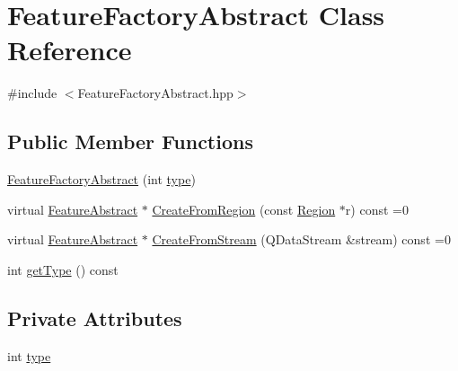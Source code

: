 \hypertarget{class_feature_factory_abstract}{\section{Feature\+Factory\+Abstract Class Reference}
\label{class_feature_factory_abstract}
}


{\ttfamily \#include $<$Feature\+Factory\+Abstract.\+hpp$>$}

\subsection*{Public Member Functions}
\begin{DoxyCompactItemize}
\item 
\hyperlink{class_feature_factory_abstract_ad4b115dcdef61da4220ddfeef13f098f}{Feature\+Factory\+Abstract} (int \hyperlink{class_feature_factory_abstract_acdc4ca5ce9d35423f420c53081f0f238}{type})
\item 
virtual \hyperlink{class_feature_abstract}{Feature\+Abstract} $\ast$ \hyperlink{class_feature_factory_abstract_a5447f78c29f0ec2ad5b1fe65679381cd}{Create\+From\+Region} (const \hyperlink{class_region}{Region} $\ast$r) const =0
\item 
virtual \hyperlink{class_feature_abstract}{Feature\+Abstract} $\ast$ \hyperlink{class_feature_factory_abstract_ab6c49610f1851cda0a4f072427786362}{Create\+From\+Stream} (Q\+Data\+Stream \&stream) const =0
\item 
int \hyperlink{class_feature_factory_abstract_ab8d13b663824c6e49c8d195344b934a3}{get\+Type} () const 
\end{DoxyCompactItemize}
\subsection*{Private Attributes}
\begin{DoxyCompactItemize}
\item 
int \hyperlink{class_feature_factory_abstract_acdc4ca5ce9d35423f420c53081f0f238}{type}
\end{DoxyCompactItemize}


